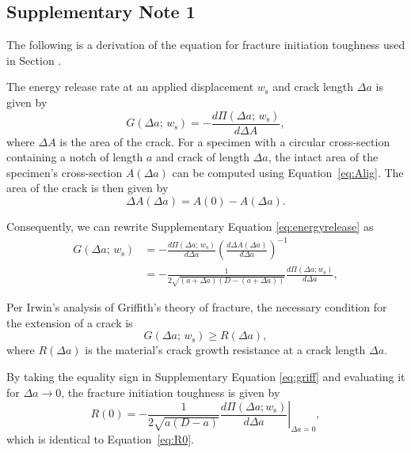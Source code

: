 \documentclass[12pt,onecolumn]{article}
\makeatletter
\DeclareRobustCommand*{\nameref}[1]{%
      \emph{\myorg@nameref{#1}}%
    }%
\makeatother
\begin{document}
\begin{bibunit}
\section*{Supplementary Note 1}
\label{sec:R0deriv}
The following is a derivation of the equation for fracture initiation toughness used in Section \nameref{sec:Gc}. 

The energy release rate at an applied displacement $w_\mathrm{s}$ and crack length $\Delta a$ is given by
%
\begin{equation}
    \label{eq:energyrelease}
    G(\Delta a;\,w_\mathrm{s})=-\frac{d\Pi(\Delta a;\,w_\mathrm{s})}{d\Delta A},
\end{equation}
%
where $\Delta A$ is the area of the crack. For a specimen with a circular cross-section containing a notch of length $a$ and crack of length $\Delta a$, the intact area of the specimen's cross-section $A(\Delta a)$ can be computed using Equation~\eqref{eq:Alig}. The area of the crack is then given by
%
\begin{equation}
    \label{eq:Acrack}
    \Delta A(\Delta a)=A(0)-A(\Delta a).
\end{equation}

Consequently, we can rewrite Supplementary Equation \eqref{eq:energyrelease} as
\begin{equation}
    \label{eq:energyrelease2}
    \begin{aligned}
    G(\Delta a;\,w_\mathrm{s})&=-\frac{d\Pi(\Delta a;\,w_\mathrm{s})}{d\Delta a}\left(\frac{d \Delta A(\Delta a)}{d\Delta a}\right)^{-1}\\
    &=-\frac{1}{2\sqrt{(a+\Delta a)(D-(a+\Delta a))}}\frac{d\Pi(\Delta a; w_\mathrm{s})}{d\Delta a },
    \end{aligned}
\end{equation}

Per Irwin's analysis of Griffith's theory of fracture, the necessary condition for the extension of a crack is
%
\begin{equation}
\label{eq:griff}
G(\Delta a;\,w_\mathrm{s}) \geq R(\Delta a),
\end{equation}
%
where $R(\Delta a)$ is the material's crack growth resistance at a crack length $\Delta a$.

By taking the equality sign in Supplementary Equation \eqref{eq:griff} and evaluating it for $\Delta a \to 0$, the fracture initiation toughness is given by
%
\begin{equation}
    \label{eq:R0deriv}
    R(0)=-\frac{1}{2\sqrt{a(D-a)}} \left.\frac{d\Pi(\Delta a; w_\mathrm{s})}{d\Delta a }\right\vert_{\Delta a=0},
\end{equation}
%
which is identical to Equation~\eqref{eq:R0}.


\end{bibunit}
\end{document}
